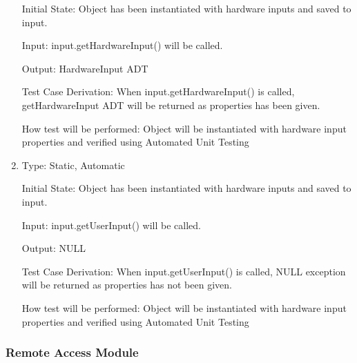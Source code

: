 \documentclass[12pt, titlepage]{article}
\begin{document}
\begin{enumerate}[{UT-IC}1.]
Initial State: Object has been instantiated with hardware inputs and saved to input.
					
Input: input.getHardwareInput() will be called.
					
Output: HardwareInput ADT

Test Case Derivation: When input.getHardwareInput() is called, getHardwareInput ADT will be returned as properties has been given.


How test will be performed: Object will be instantiated with hardware input properties and verified using Automated Unit Testing 

\item

Type: Static, Automatic
					
Initial State: Object has been instantiated with hardware inputs and saved to input.
					
Input: input.getUserInput() will be called.
					
Output: NULL

Test Case Derivation: When input.getUserInput() is called, NULL exception will be returned as properties has not been given.


How test will be performed: Object will be instantiated with hardware input properties and verified using Automated Unit Testing

    
\end{enumerate}

\subsubsection{Remote Access Module}
\end{document}
